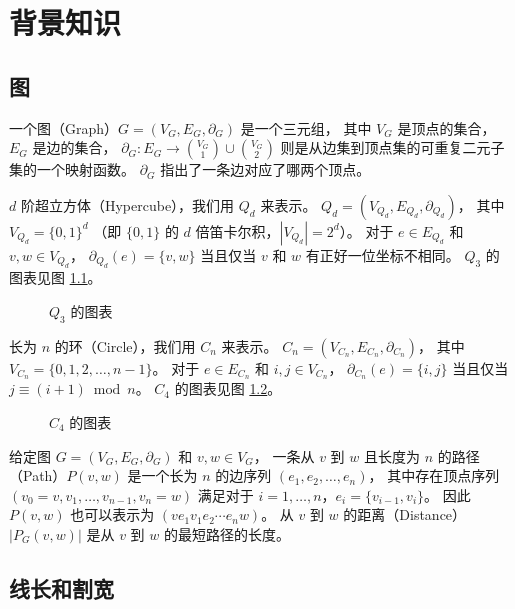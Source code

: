 
\chapter{背景知识}
\label{Chapter 2}

\section{图}
\label{Section 2.1}

一个图（Graph）$G = (V_G, E_G, \partial_G)$ 是一个三元组，
其中 $V_G$ 是顶点的集合，$E_G$ 是边的集合，
$\partial_G \colon E_G \rightarrow \binom{V_G}{1} \cup \binom{V_G}{2}$
则是从边集到顶点集的可重复二元子集的一个映射函数。
$\partial_G$ 指出了一条边对应了哪两个顶点。

$d$ 阶超立方体（Hypercube），我们用 $Q_d$ 来表示。
$Q_d = (V_{Q_d}, E_{Q_d}, \partial_{Q_d})$，
其中 $V_{Q_d} = \{0, 1\}^d$
（即 $\{0, 1\}$ 的 $d$ 倍笛卡尔积，$|V_{Q_d}| = 2^d$）。
对于 $e \in E_{Q_d}$ 和 $v, w \in V_{Q_d}$，
$\partial_{Q_d}(e) = \{v, w\}$ 当且仅当 $v$ 和 $w$ 有正好一位坐标不相同。
$Q_3$ 的图表见图 \ref{Figure 1}。

\begin{figure}[h!]
	\centering
	
	\caption{$Q_3$ 的图表}
	\label{Figure 1}
\end{figure}

长为 $n$ 的环（Circle），我们用 $C_n$ 来表示。
$C_n = (V_{C_n}, E_{C_n}, \partial_{C_n})$，
其中 $V_{C_n} = \{0, 1, 2, \dots, n - 1\}$。
对于 $e \in E_{C_n}$ 和 $i, j \in V_{C_n}$，
$\partial_{C_n}(e) = \{i, j\}$ 当且仅当 $j \equiv (i + 1) \bmod n$。
$C_4$ 的图表见图 \ref{Figure 2}。

\begin{figure}[h!]
	\centering
	
	\caption{$C_4$ 的图表}
	\label{Figure 2}
\end{figure}

给定图 $G = (V_G, E_G, \partial_G)$ 和 $v, w \in V_G$，
一条从 $v$ 到 $w$ 且长度为 $n$ 的路径（Path）$P(v, w)$ 是一个长为 $n$ 的边序列
$(e_1, e_2, \dots, e_n)$，
其中存在顶点序列 $(v_0 = v, v_1, \dots, v_{n - 1}, v_n = w)$
满足对于 $i = 1, \dots, n$，$e_i = \{v_{i - 1}, v_i\}$。
因此 $P(v, w)$ 也可以表示为 $(v e_1 v_1 e_2 \cdots e_n w)$。
从 $v$ 到 $w$ 的距离（Distance）$|P_G(v, w)|$ 是从 $v$ 到 $w$ 的最短路径的长度。

\section{线长和割宽}
\label{Section 2.2}


